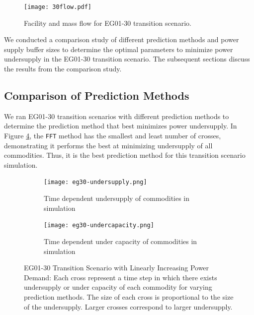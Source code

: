 \begin{figure}[]
    \centering
    \texttt{[image: 30flow.pdf]} 
    \caption{Facility and mass flow for EG01-30 transition scenario.}
    \label{fig:30flow}
\end{figure}

We conducted a comparison study of different prediction 
methods and power supply buffer sizes to determine the 
optimal \deploy parameters to minimize 
power undersupply in the EG01-30 \Cyclus 
transition scenario. 
The subsequent sections discuss the results from the comparison 
study. 

\subsection{Comparison of Prediction Methods}
We ran EG01-30 transition scenarios with different prediction 
methods to determine the prediction method that best minimizes 
power undersupply. 
In Figure \ref{fig:eg30under}, the \texttt{FFT} method has
the smallest and least number of crosses, 
demonstrating it performs the best at minimizing 
undersupply of all commodities.
Thus, it is the best prediction method for this transition 
scenario simulation. 

\begin{figure}[]
	\centering
	\begin{subfigure}[t]{1\textwidth}
		\centering
		\texttt{[image: eg30-undersupply.png]} 
		\caption{Time dependent undersupply of commodities in simulation }
		\label{fig:30undersupply}
	\end{subfigure}
	\vspace{1cm}
	\begin{subfigure}[t]{1\textwidth}
		\centering
		\texttt{[image: eg30-undercapacity.png]} 
		\caption{Time dependent under capacity of commodities in simulation }
		\label{fig:30undercapacity}
	\end{subfigure}
	\hfill
	\caption{
	EG01-30 Transition Scenario with Linearly Increasing Power Demand:
	Each cross represent a time step in which there exists undersupply 
	or under capacity of each commodity for varying prediction methods. 
    The size of each cross is proportional to the size of the undersupply.
    Larger crosses correspond to larger undersupply.}
	\label{fig:eg30under}
\end{figure}

